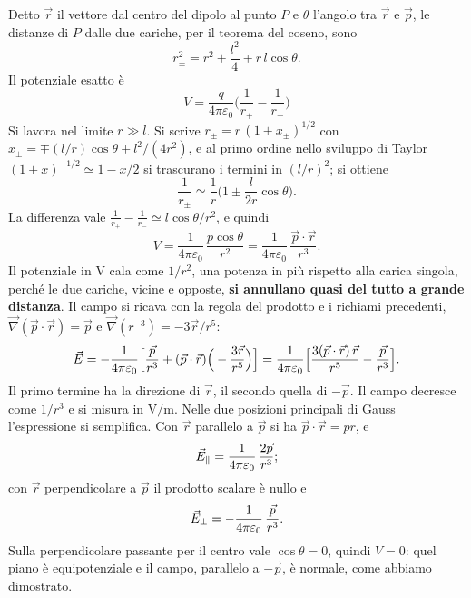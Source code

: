 \documentclass[11pt,a4paper]{article}
\begin{document}
Detto $\vec r$ il vettore dal centro del dipolo al punto $P$ e $\theta$ l'angolo tra $\vec r$ e $\vec p$, le distanze di $P$ dalle due cariche, per il teorema del coseno, sono
\[
r_\pm^2=r^2+\frac{l^2}{4}\mp r\,l\cos\theta .
\]
Il potenziale esatto è 
\[ 
V=\frac{q}{4\pi\varepsilon_0}\big(\frac1{r_+}-\frac1{r_-}\big) 
\]
Si lavora nel limite $r\gg l$. Si scrive $r_\pm=r\,(1+x_\pm)^{1/2}$ con $x_\pm=\mp(l/r)\cos\theta+l^2/(4r^2)$, e al primo ordine nello sviluppo di Taylor $(1+x)^{-1/2}\simeq1-x/2$ si trascurano i termini in $(l/r)^2$; si ottiene
\[
\frac1{r_\pm}\simeq\frac1r\Big(1\pm\frac{l}{2r}\cos\theta\Big).
\]
La differenza vale $\frac1{r_+}-\frac1{r_-}\simeq l\cos\theta/r^2$, e quindi
\[
V=\frac{1}{4\pi\varepsilon_0}\,\frac{p\cos\theta}{r^2}=\frac{1}{4\pi\varepsilon_0}\,\frac{\vec p\cdot\vec r}{r^3}.
\]
Il potenziale in $\ensuremath{\mathrm{V}}$ cala come $1/r^2$, una potenza in più rispetto alla carica singola, perché le due cariche, vicine e opposte, \textbf{si annullano quasi del tutto a grande distanza}. Il campo si ricava con la regola del prodotto e i richiami precedenti, $\vec \nabla(\vec p\cdot\vec r)=\vec p$ e $\vec \nabla(r^{-3})=-3\vec r/r^5$:
\[
\vec E=-\frac{1}{4\pi\varepsilon_0}\Big[\frac{\vec p}{r^3}+(\vec p\cdot\vec r)\Big(-\frac{3\vec r}{r^5}\Big)\Big]
=\frac{1}{4\pi\varepsilon_0}\Big[\frac{3(\vec p\cdot\vec r)\,\vec r}{r^5}-\frac{\vec p}{r^3}\Big].
\]
Il primo termine ha la direzione di $\vec r$, il secondo quella di $-\vec p$. Il campo decresce come $1/r^3$ e si misura in $\ensuremath{\mathrm{V/m}}$. Nelle due posizioni principali di Gauss l'espressione si semplifica. Con $\vec r$ parallelo a $\vec p$ si ha $\vec p\cdot\vec r=pr$, e
\[
\vec E_{\parallel}=\frac{1}{4\pi\varepsilon_0}\,\frac{2\vec p}{r^3};
\]
con $\vec r$ perpendicolare a $\vec p$ il prodotto scalare è nullo e
\[
\vec E_{\perp}=-\frac{1}{4\pi\varepsilon_0}\,\frac{\vec p}{r^3}.
\]
Sulla perpendicolare passante per il centro vale $\cos\theta=0$, quindi $V=0$: quel piano è equipotenziale e il campo, parallelo a $-\vec p$, è normale, come abbiamo dimostrato.
\end{document}
